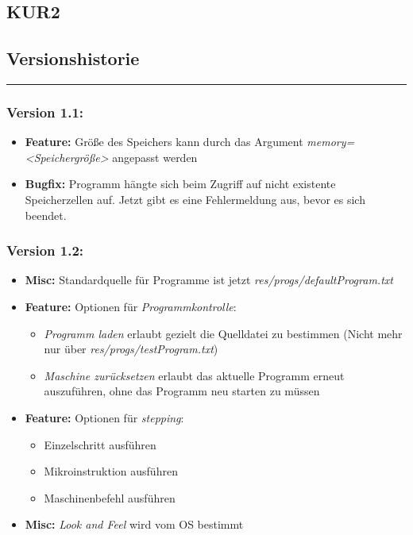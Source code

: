 \documentclass[a4paper,10pt]{article}
\begin{document}
\begin{center}
\section*{KUR2}
\subsection*{Versionshistorie}
\end{center}

\hrule
\vspace{.5cm}

\subsubsection*{Version 1.1:}
\begin{itemize}
\item \textbf{Feature:} Größe des Speichers kann durch das Argument \textit{memory=<Speichergröße>} angepasst werden
\item \textbf{Bugfix:} Programm hängte sich beim Zugriff auf nicht existente Speicherzellen auf. Jetzt gibt es eine Fehlermeldung aus, bevor es sich beendet.
\end{itemize}

\subsubsection*{Version 1.2:}
\begin{itemize}
	\item \textbf{Misc:} Standardquelle für Programme ist jetzt \textit{res/progs/defaultProgram.txt}
	\item \textbf{Feature:} Optionen für \textit{Programmkontrolle}:
		\begin{itemize}
			\item \textit{Programm laden} erlaubt gezielt die Quelldatei zu bestimmen (Nicht mehr nur über \textit{res/progs/testProgram.txt})
			\item \textit{Maschine zurücksetzen} erlaubt das aktuelle Programm erneut auszuführen, ohne das Programm neu starten zu müssen
		\end{itemize}
	\item \textbf{Feature:} Optionen für \textit{stepping}:
		\begin{itemize}
			\item Einzelschritt ausführen
			\item Mikroinstruktion ausführen
			\item Maschinenbefehl ausführen
		\end{itemize}
	\item \textbf{Misc:} \textit{Look and Feel} wird vom OS bestimmt
\end{itemize}
\end{document}
